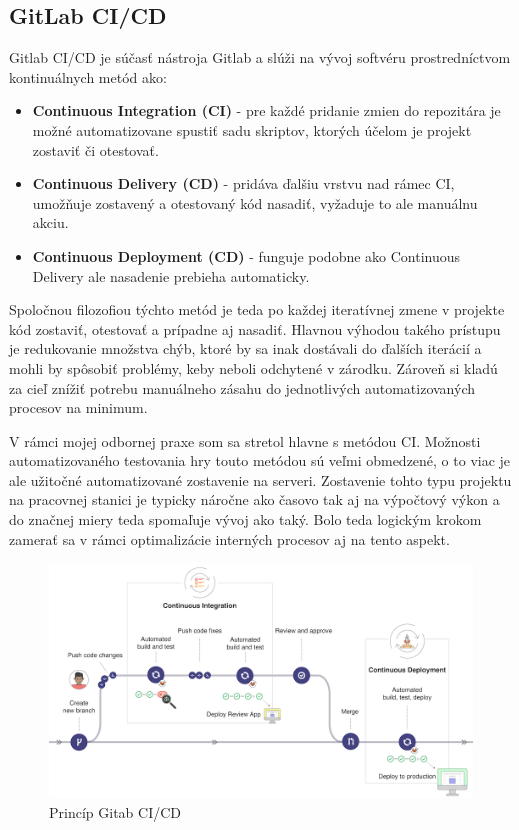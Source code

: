 \documentclass[slovak,bachelorpractice,dept460,male,csharp,cpdeclaration]{diploma}
\begin{document}
\subsection{GitLab CI/CD}
\label{sec:GitLab}
Gitlab CI/CD \cite{Cicd} je súčasť nástroja Gitlab a slúži na vývoj softvéru prostredníctvom kontinuálnych metód ako:
\begin{itemize}
  \item \textbf{Continuous Integration (CI)} - pre každé pridanie zmien do repozitára je možné automatizovane spustiť sadu skriptov, ktorých účelom je projekt zostaviť či otestovať.
  \item \textbf{Continuous Delivery (CD)} - pridáva ďalšiu vrstvu nad rámec CI, umožňuje zostavený a otestovaný kód nasadiť, vyžaduje to ale manuálnu akciu.
  \item \textbf{Continuous Deployment (CD)} - funguje podobne ako Continuous Delivery ale nasadenie prebieha automaticky.
\end{itemize}
Spoločnou filozofiou týchto metód je teda po každej iteratívnej zmene v projekte kód zostaviť, otestovať a prípadne aj nasadiť. Hlavnou výhodou takého prístupu je redukovanie množstva chýb, ktoré by sa inak dostávali do ďalších iterácií a mohli by spôsobiť problémy, keby neboli odchytené v zárodku. Zároveň si kladú za cieľ znížiť potrebu manuálneho zásahu do jednotlivých automatizovaných procesov na minimum.

V rámci mojej odbornej praxe som sa stretol hlavne s metódou CI. Možnosti automatizovaného testovania hry touto metódou sú veľmi obmedzené, o to viac je ale užitočné automatizované zostavenie na serveri. Zostavenie tohto typu projektu na pracovnej stanici je typicky náročne ako časovo tak aj na výpočtový výkon a do značnej miery teda spomaľuje vývoj ako taký. Bolo teda logickým krokom zamerať sa v rámci optimalizácie interných procesov aj na tento aspekt.

\begin{figure}[!htbp]
	\centering
	\includegraphics[width=1\textwidth]{Pictures/gitlab.png}
	\caption{Princíp Gitab CI/CD \cite{Cicd}}
	\label{pic:Gitlab}
\end{figure}
\end{document}
